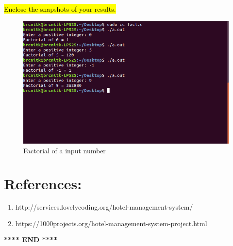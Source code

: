 \documentclass[12pt]{article}
\begin{document}
\hl{Enclose the snapshots of your results.}

\begin{figure}[h!]
    \centering
    \includegraphics[width = \columnwidth]{output.png} %
    \caption{Factorial of a input number}
\end{figure}

\newpage
\section{References:}
\begin{enumerate}
    \item http://services.lovelycoding.org/hotel-management-system/
    \item https://1000projects.org/hotel-management-system-project.html
\end{enumerate}


\begin{center}
    \textbf{**** END ****}
\end{center}
\end{document}
